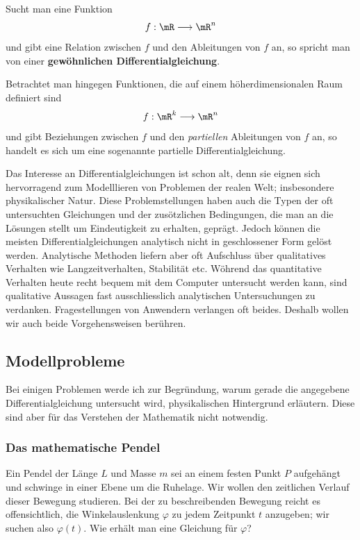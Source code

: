 \documentclass[%
11pt,%
twoside,%
titlepage,%
german,%
headsepline%
]{scrartcl}
\begin{document}
\begin{defn}
Sucht man eine Funktion
$$f:\mR\longrightarrow\mR^n$$
und gibt eine Relation zwischen $f$ und den Ableitungen von $f$ an, so spricht man von einer \textbf{gew\"ohnlichen Differentialgleichung}.
\end{defn}


\begin{bem}
Betrachtet man hingegen Funktionen, die auf einem h\"oherdimensionalen Raum definiert sind
$$f:\mR^k\longrightarrow\mR^n$$
und gibt Beziehungen zwischen $f$ und den \emph{partiellen} Ableitungen von $f$ an, so handelt es sich um eine sogenannte partielle Differentialgleichung.
\end{bem}

Das Interesse an Differentialgleichungen ist schon alt, denn sie eignen sich hervorragend zum Modelllieren von Problemen der realen Welt; insbesondere physikalischer Natur. Diese Problemstellungen haben auch die Typen der oft untersuchten Gleichungen und der zus\"otzlichen Bedingungen, die man an die L\"osungen stellt um Eindeutigkeit zu erhalten, gepr\"agt. Jedoch k\"onnen die meisten Differentialgleichungen analytisch nicht in geschlossener Form gel\"ost werden. Analytische Methoden liefern aber oft Aufschluss \"uber qualitatives Verhalten wie Langzeitverhalten, Stabilit\"at etc. W\"ohrend das quantitative Verhalten heute recht bequem mit dem Computer untersucht werden kann, sind qualitative Aussagen fast ausschliesslich analytischen Untersuchungen zu verdanken. Fragestellungen von Anwendern verlangen oft beides. Deshalb wollen wir auch beide Vorgehensweisen ber\"uhren.

\subsection{Modellprobleme}

Bei einigen Problemen werde ich zur Begr\"undung, warum gerade die angegebene Differentialgleichung untersucht wird, physikalischen Hintergrund erl\"autern. Diese sind aber f\"ur das Verstehen der Mathematik nicht notwendig.

\subsubsection{Das mathematische Pendel}

Ein
Pendel der L\"ange $L$ und Masse $m$ sei an einem festen Punkt $P$ aufgeh\"angt und schwinge in einer Ebene um die Ruhelage. Wir wollen den zeitlichen Verlauf dieser Bewegung studieren. Bei der zu beschreibenden Bewegung reicht es offensichtlich, die Winkelauslenkung $\varphi$ zu jedem Zeitpunkt $t$ anzugeben; wir suchen also $\varphi(t)$. Wie erh\"alt man eine Gleichung f\"ur $\varphi$?
\end{document}
